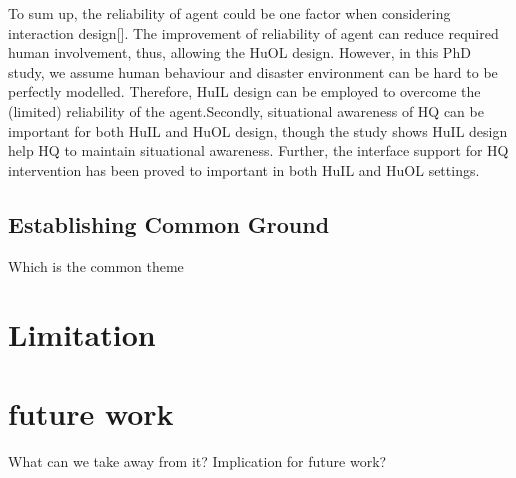 To sum up, the reliability of agent could be one factor when considering interaction design[]. The improvement of reliability of agent can reduce required human involvement, thus, allowing the HuOL design. However, in this PhD study, we assume human behaviour and disaster environment can be hard to be perfectly modelled. Therefore, HuIL design can be employed to overcome the (limited) reliability of the agent.Secondly, situational awareness of HQ can be important for both HuIL and HuOL design, though the study shows HuIL design help HQ to maintain situational awareness. Further, the interface support for HQ intervention has been proved to important in both HuIL and HuOL settings.\\


\subsection{Establishing Common Ground}




Which is the common theme


\section{Limitation}


\section{future work}
What can we take away from it? Implication for future work? 
